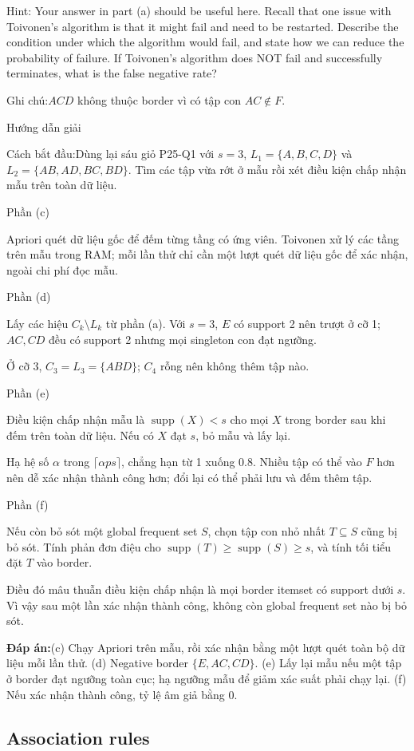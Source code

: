 \documentclass[10pt,a4paper,twocolumn]{article}
\makeatletter
\newcommand{\maptag}[1]{\phantomsection\@bsphack\protected@write\@auxout{}{\string\newlabel{#1}{{}{\thepage}{}{\@currentHref}{}}}\@esphack}
\newif\ifexamheadingprinted
\newcommand{\topic}[2]{%
  \global\examheadingprintedfalse\par\subsection{#2}\label{topic:#1}}
\newcommand{\key}[1]{#1:\enspace}
\newcommand{\solutionprompt}[1]{\par\addvspace{1pt}\noindent\key{Cách bắt đầu}#1\par\addvspace{2pt}}
\newcommand{\examnote}[1]{\par\addvspace{2pt}\noindent\key{Ghi chú}#1\par\addvspace{3pt}}
\newcommand{\blocklabel}[1]{\par\noindent#1\par\nobreak}
\newcommand{\answer}[1]{%
  \par\addvspace{3pt}%
  \blocklabel{#1Hướng dẫn giải}}
\newcommand{\finalanswer}[1]{%
  \par\addvspace{3pt}\noindent\textbf{Đáp án:}\nobreak\enspace#1\par}
\newcommand{\guidepart}[1]{%
  \par\addvspace{1.5pt}%
  \blocklabel{Phần #1}}
\makeatother
\begin{document}
Hint: Your answer in part (a) should be useful here.
 Recall that one issue with Toivonen's algorithm is that it might fail and need to be restarted. Describe the condition under which the algorithm would fail, and state how we can reduce the probability of failure.
 If Toivonen's algorithm does NOT fail and successfully terminates, what is the false negative rate?

\examnote{$ACD$ không thuộc border vì có tập con $AC\notin F$.}
\answer{\maptag{answer:P25-Q1cdf}}
\solutionprompt{Dùng lại sáu giỏ P25-Q1 với $s=3$, $L_1=\{A,B,C,D\}$ và $L_2=\{AB,AD,BC,BD\}$. Tìm các tập vừa rớt ở mẫu rồi xét điều kiện chấp nhận mẫu trên toàn dữ liệu.}
\guidepart{(c)}
\begin{guidesteps}
\item Apriori quét dữ liệu gốc để đếm từng tầng có ứng viên. Toivonen xử lý các tầng trên mẫu trong RAM; mỗi lần thử chỉ cần một lượt quét dữ liệu gốc để xác nhận, ngoài chi phí đọc mẫu.
\end{guidesteps}
\guidepart{(d)}
\begin{guidesteps}
\item Lấy các hiệu $C_k\setminus L_k$ từ phần (a). Với $s=3$, $E$ có support 2 nên trượt ở cỡ 1; $AC,CD$ đều có support 2 nhưng mọi singleton con đạt ngưỡng.
\item Ở cỡ 3, $C_3=L_3=\{ABD\}$; $C_4$ rỗng nên không thêm tập nào.
\end{guidesteps}
\guidepart{(e)}
\begin{guidesteps}
\item Điều kiện chấp nhận mẫu là $\operatorname{supp}(X)<s$ cho mọi $X$ trong border sau khi đếm trên toàn dữ liệu. Nếu có $X$ đạt $s$, bỏ mẫu và lấy lại.
\item Hạ hệ số $\alpha$ trong $\lceil\alpha ps\rceil$, chẳng hạn từ 1 xuống 0.8. Nhiều tập có thể vào $F$ hơn nên dễ xác nhận thành công hơn; đổi lại có thể phải lưu và đếm thêm tập.
\end{guidesteps}
\guidepart{(f)}
\begin{guidesteps}
\item Nếu còn bỏ sót một global frequent set $S$, chọn tập con nhỏ nhất $T\subseteq S$ cũng bị bỏ sót. Tính phản đơn điệu cho $\operatorname{supp}(T)\ge\operatorname{supp}(S)\ge s$, và tính tối tiểu đặt $T$ vào border.
\item Điều đó mâu thuẫn điều kiện chấp nhận là mọi border itemset có support dưới $s$. Vì vậy sau một lần xác nhận thành công, không còn global frequent set nào bị bỏ sót.
\end{guidesteps}
\finalanswer{(c) Chạy Apriori trên mẫu, rồi xác nhận bằng một lượt quét toàn bộ dữ liệu mỗi lần thử. (d) Negative border $\{E,AC,CD\}$. (e) Lấy lại mẫu nếu một tập ở border đạt ngưỡng toàn cục; hạ ngưỡng mẫu để giảm xác suất phải chạy lại. (f) Nếu xác nhận thành công, tỷ lệ âm giả bằng $0$.}
\topic{rules}{Association rules}
\end{document}
